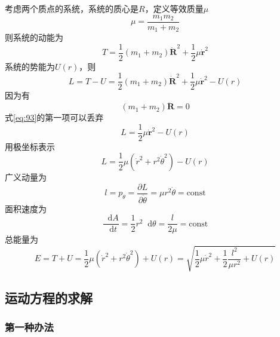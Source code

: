 \documentclass{article}
\newcommand*{\dif}{\mathop{}\!\mathrm{d}}
\begin{document}
考虑两个质点的系统，系统的质心是$R$，定义等效质量$\mu$
\begin{equation}
  \label{eq:91}
  \mu = \dfrac{m_{1} m_{2}}{m_{1} + m_{2}} 
\end{equation}
则系统的动能为
\begin{equation}
  \label{eq:92}
  T = \dfrac{1}{2} \left( m_{1} + m_{2} \right) \dot{\mathbf{R}}^{2} + \dfrac{1}{2} \mu \dot{\mathbf{r}}^{2}
\end{equation}
系统的势能为$U(r)$，则
\begin{equation}
  \label{eq:93}
  L = T - U =  \dfrac{1}{2} \left( m_{1} + m_{2} \right) \dot{\mathbf{R}}^{2} + \dfrac{1}{2} \mu \dot{\mathbf{r}}^{2} - U(r)
\end{equation}
因为有
\begin{equation}
  \label{eq:94}
  \left( m_{1} + m_{2} \right)\ddot{\mathbf{R}} = 0
\end{equation}
式\ref{eq:93}的第一项可以丢弃
\begin{equation}
  \label{eq:95}
  L = \dfrac{1}{2} \mu \dot{\mathbf{r}}^{2} - U(r)
\end{equation}
用极坐标表示
\begin{equation}
  \label{eq:96}
  L = \dfrac{1}{2} \mu \left( \dot{r}^{2} + r^{2} \dot{\theta}^{2} \right) - U(r)
\end{equation}
广义动量为
\begin{equation}
  \label{eq:97}
  l = p_{\theta} = \dfrac{\partial L}{\partial \dot{\theta}} = \mu r^{2} \dot{\theta} = \mathrm{const} 
\end{equation}
面积速度为
\begin{equation}
  \label{eq:98}
  \dfrac{\dif A }{\dif t} = \dfrac{1}{2} r^{2} \dif \theta = \dfrac{l}{2\mu} = \mathrm{const}
\end{equation}
总能量为
\begin{equation}
  \label{eq:99}
  E = T + U = \dfrac{1}{2} \mu \left( \dot{r}^{2} + r^{2} \dot{\theta}^{2} \right) + U(r) = \sqrt{ \dfrac{1}{2} \mu \dot{r}^{2} + \dfrac{1}{2} \dfrac{l^{2}}{\mu r^{2}} + U(r) }
\end{equation}

\subsection{运动方程的求解}

\subsubsection{第一种办法}
\end{document}
